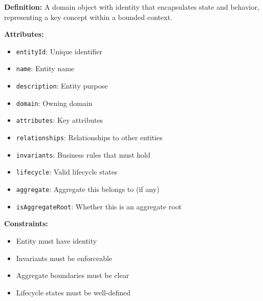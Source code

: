 \documentclass[11pt,letterpaper]{article}
\begin{document}
\begin{definitionbox}
\textbf{Definition:} A domain object with identity that encapsulates state and behavior, representing a key concept within a bounded context.

\textbf{Attributes:}
\begin{itemize}[nosep]
    \item \texttt{entityId}: Unique identifier
    \item \texttt{name}: Entity name
    \item \texttt{description}: Entity purpose
    \item \texttt{domain}: Owning domain
    \item \texttt{attributes}: Key attributes
    \item \texttt{relationships}: Relationships to other entities
    \item \texttt{invariants}: Business rules that must hold
    \item \texttt{lifecycle}: Valid lifecycle states
    \item \texttt{aggregate}: Aggregate this belongs to (if any)
    \item \texttt{isAggregateRoot}: Whether this is an aggregate root
\end{itemize}

\textbf{Constraints:}
\begin{itemize}[nosep]
    \item Entity must have identity
    \item Invariants must be enforceable
    \item Aggregate boundaries must be clear
    \item Lifecycle states must be well-defined
\end{itemize}
\end{definitionbox}
\end{document}
